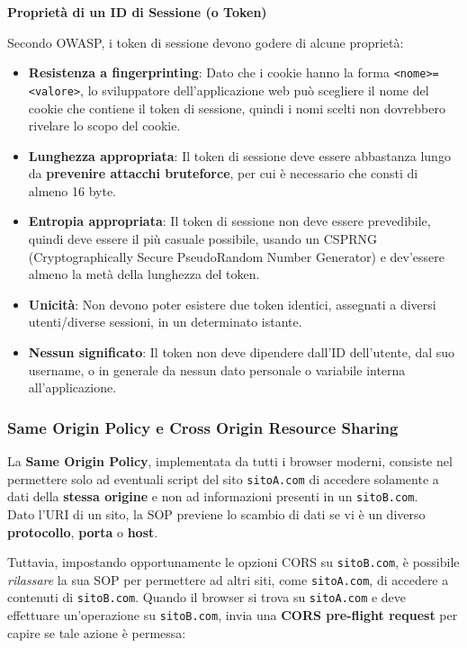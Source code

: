 \documentclass{article}
\begin{document}
\textbf{Proprietà di un ID di Sessione (o Token)}

Secondo OWASP, i token di sessione devono godere di alcune proprietà:
\begin{itemize}
    \item \textbf{Resistenza a fingerprinting}: Dato che i cookie hanno la forma \verb|<nome>=<valore>|, lo sviluppatore dell’applicazione web può scegliere il nome del cookie che contiene il token di sessione, quindi i nomi scelti non dovrebbero rivelare lo scopo del cookie.

    \item \textbf{Lunghezza appropriata}: Il token di sessione deve essere abbastanza lungo da \textbf{prevenire attacchi bruteforce}, per cui è necessario che consti di almeno 16 byte.

    \item \textbf{Entropia appropriata}: Il token di sessione non deve essere prevedibile, quindi deve essere il più casuale possibile, usando un CSPRNG (Cryptographically Secure PseudoRandom Number Generator) e dev'essere almeno la metà della lunghezza del token.

    \item \textbf{Unicità}: Non devono poter esistere due token identici, assegnati a diversi utenti/diverse sessioni, in un determinato istante.

    \item \textbf{Nessun significato}:  Il token non deve dipendere dall’ID dell’utente, dal suo username, o in generale da nessun dato personale o variabile interna all’applicazione.
\end{itemize}

\subsubsection{Same Origin Policy e Cross Origin Resource Sharing}
La \textbf{Same Origin Policy}, implementata da tutti i browser moderni, consiste nel permettere solo ad eventuali script del sito \verb|sitoA.com| di accedere solamente a dati della \textbf{stessa origine} e non ad informazioni presenti in un \verb|sitoB.com|.\\
Dato l'URI di un sito, la SOP previene lo scambio di dati se vi è un diverso \textbf{protocollo}, \textbf{porta}  o \textbf{host}.

Tuttavia, impostando opportunamente le opzioni CORS su \verb|sitoB.com|, è possibile \textit{rilassare} la sua SOP per permettere ad altri siti, come \verb|sitoA.com|, di accedere a contenuti di \verb|sitoB.com|.
\newpage
Quando il browser si trova su \verb|sitoA.com| e deve effettuare un’operazione su \verb|sitoB.com|, invia una \textbf{CORS pre-flight request} per capire se tale azione è permessa:
\end{document}
